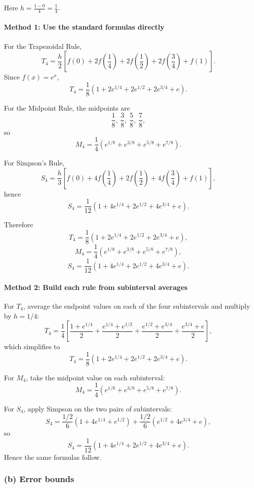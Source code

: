 \documentclass[12pt]{article}
\begin{document}
Here \(h=\frac{1-0}{4}=\frac14\).

\paragraph{Method 1: Use the standard formulas directly}
For the Trapezoidal Rule,
\[
T_4=\frac{h}{2}\left[f(0)+2f\!\left(\frac14\right)+2f\!\left(\frac12\right)+2f\!\left(\frac34\right)+f(1)\right].
\]
Since \(f(x)=e^x\),
\[
T_4
=
\frac18\left(1+2e^{1/4}+2e^{1/2}+2e^{3/4}+e\right).
\]

For the Midpoint Rule, the midpoints are
\[
\frac18,\ \frac38,\ \frac58,\ \frac78,
\]
so
\[
M_4
=
\frac14\left(e^{1/8}+e^{3/8}+e^{5/8}+e^{7/8}\right).
\]

For Simpson's Rule,
\[
S_4=\frac{h}{3}\left[f(0)+4f\!\left(\frac14\right)+2f\!\left(\frac12\right)+4f\!\left(\frac34\right)+f(1)\right],
\]
hence
\[
S_4
=
\frac{1}{12}\left(1+4e^{1/4}+2e^{1/2}+4e^{3/4}+e\right).
\]

Therefore
\[
\boxed{
T_4=\frac18\left(1+2e^{1/4}+2e^{1/2}+2e^{3/4}+e\right),
}
\]
\[
\boxed{
M_4=\frac14\left(e^{1/8}+e^{3/8}+e^{5/8}+e^{7/8}\right),
}
\]
\[
\boxed{
S_4=\frac1{12}\left(1+4e^{1/4}+2e^{1/2}+4e^{3/4}+e\right).
}
\]

\paragraph{Method 2: Build each rule from subinterval averages}
For \(T_4\), average the endpoint values on each of the four subintervals and multiply by \(h=1/4\):
\[
T_4
=
\frac14\left[
\frac{1+e^{1/4}}{2}
+
\frac{e^{1/4}+e^{1/2}}{2}
+
\frac{e^{1/2}+e^{3/4}}{2}
+
\frac{e^{3/4}+e}{2}
\right],
\]
which simplifies to
\[
T_4=\frac18\left(1+2e^{1/4}+2e^{1/2}+2e^{3/4}+e\right).
\]

For \(M_4\), take the midpoint value on each subinterval:
\[
M_4
=
\frac14\left(e^{1/8}+e^{3/8}+e^{5/8}+e^{7/8}\right).
\]

For \(S_4\), apply Simpson on the two pairs of subintervals:
\[
S_4
=
\frac{1/2}{6}\left(1+4e^{1/4}+e^{1/2}\right)
+
\frac{1/2}{6}\left(e^{1/2}+4e^{3/4}+e\right),
\]
so
\[
S_4=\frac1{12}\left(1+4e^{1/4}+2e^{1/2}+4e^{3/4}+e\right).
\]
Hence the same formulas follow.

\bigskip

\subsubsection{(b) Error bounds}
\end{document}
